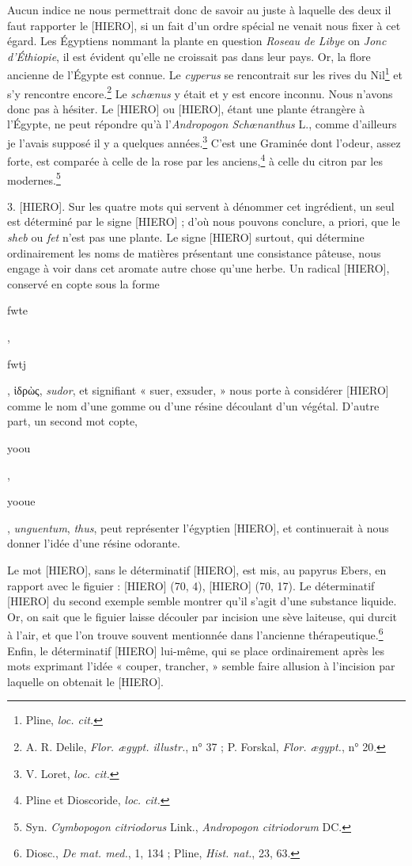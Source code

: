 \documentclass[a4paper, 11pt, oneside]{article}
\begin{document}
Aucun indice ne nous permettrait donc de savoir au juste à laquelle des deux il faut rapporter le [HIERO], si un fait d'un ordre spécial ne venait nous fixer à cet égard. Les Égyptiens nommant la plante en question \emph{Roseau de Libye} on \emph{Jonc d'Éthiopie}, il est évident qu'elle ne croissait pas dans leur pays. Or, la flore ancienne de l'Égypte est connue. Le \emph{cyperus} se rencontrait sur les rives du Nil\footnote{Pline, \emph{loc. cit.}} et s'y rencontre encore.\footnote{A. R. Delile, \emph{Flor. ægypt. illustr.}, n° 37 ; P. Forskal, \emph{Flor. ægypt.}, n° 20.} Le \emph{schœnus} y était et y est encore inconnu. Nous n'avons donc pas à hésiter. Le [HIERO] ou [HIERO], étant une plante étrangère à l'Égypte, ne peut répondre qu'à l'\emph{Andropogon Schœnanthus} L., comme d'ailleurs je l'avais supposé il y a quelques années.\footnote{V. Loret, \emph{loc. cit.}} C'est une Graminée dont l'odeur, assez forte, est comparée à celle de la rose par les anciens,\footnote{Pline et Dioscoride, \emph{loc. cit.}} à celle du citron par les modernes.\footnote{Syn. \emph{Cymbopogon citriodorus} Link., \emph{Andropogon citriodorum} DC.}

3. [HIERO]. Sur les quatre mots qui servent à dénommer cet ingrédient, un seul est déterminé par le signe [HIERO] ; d'où nous pouvons conclure, a priori, que le \emph{sheb} ou \emph{fet} n'est pas une plante. Le signe [HIERO] surtout, qui détermine ordinairement les noms de matières présentant une consistance pâteuse, nous engage à voir dans cet aromate autre chose qu'une herbe. Un radical [HIERO], conservé en copte sous la forme \begin{coptic}fwte\end{coptic}, \begin{coptic}fwtj\end{coptic}, ἱδρὼς, \emph{sudor}, et signifiant « suer, exsuder, » nous porte à considérer [HIERO] comme le nom d'une gomme ou d'une résine découlant d'un végétal. D'autre part, un second mot copte, \begin{coptic}yoou\end{coptic}, \begin{coptic}yooue\end{coptic}, \emph{unguentum}, \emph{thus}, peut représenter l'égyptien [HIERO], et continuerait à nous donner l'idée d'une résine odorante.

Le mot [HIERO], sans le déterminatif [HIERO], est mis, au papyrus Ebers, en rapport avec le figuier : [HIERO] (70, 4), [HIERO] (70, 17). Le déterminatif [HIERO] du second exemple semble montrer qu'il s'agit d'une substance liquide. Or, on sait que le figuier laisse découler par incision une sève laiteuse, qui durcit à l'air, et que l'on trouve souvent mentionnée dans l'ancienne thérapeutique.\footnote{Diosc., \emph{De mat. med.}, 1, 134 ; Pline, \emph{Hist. nat.}, 23, 63.} Enfin, le déterminatif [HIERO] lui-même, qui se place ordinairement après les mots exprimant l'idée « couper, trancher, » semble faire allusion à l'incision par laquelle on obtenait le [HIERO].
\end{document}
